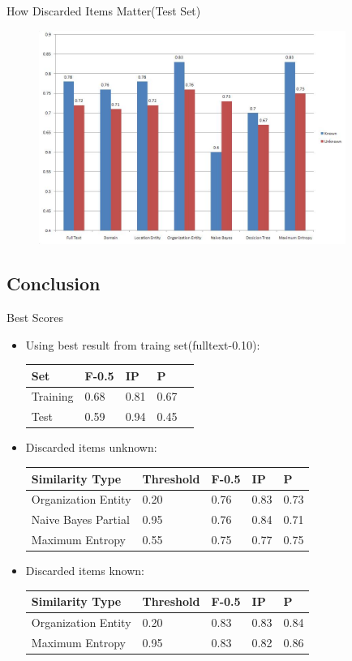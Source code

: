 \documentclass{beamer}
\begin{document}
\begin{frame}{How Discarded Items Matter(Test Set)}
\begin{figure}
\includegraphics[width=100mm]{discard}
\end{figure}
\end{frame}

\subsection{Conclusion}
\begin{frame}{Best Scores}
\begin{itemize}
\item Using best result from traing set(fulltext-0.10):
\begin{tabular}{|l|l|l|l|l|}
\hline
\textbf{Set} & \textbf{F-0.5} & \textbf{IP} & \textbf{P} \\
\hline
Training &  0.68 & 0.81 & 0.67 \\
\hline
Test&  0.59 & 0.94 & 0.45 \\
\hline
\end{tabular}
\item Discarded items unknown:
\begin{tabular}{|l|l|l|l|l|}
\hline
\textbf{Similarity Type} & \textbf{Threshold} & \textbf{F-0.5} & \textbf{IP} & \textbf{P} \\
\hline
Organization Entity & 0.20 & 0.76 & 0.83 & 0.73 \\
\hline
Naive Bayes Partial & 0.95 & 0.76 & 0.84 & 0.71 \\
\hline
Maximum Entropy & 0.55 & 0.75 & 0.77 & 0.75 \\
\hline
\end{tabular}
\item Discarded items known:
\begin{tabular}{|l|l|l|l|l|}
\hline
\textbf{Similarity Type} & \textbf{Threshold} & \textbf{F-0.5} & \textbf{IP} & \textbf{P} \\
\hline
Organization Entity & 0.20 & 0.83 & 0.83 & 0.84 \\
\hline
Maximum Entropy & 0.95 & 0.83 & 0.82 & 0.86 \\
\hline
\end{tabular}
\end{itemize}
\end{frame}
\end{document}
